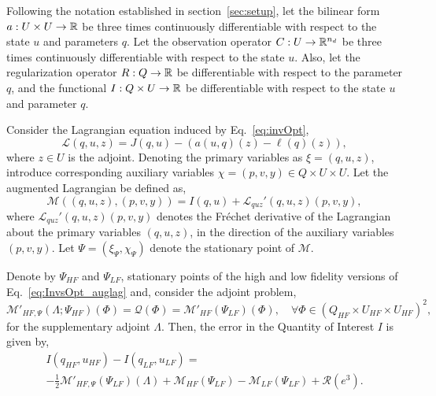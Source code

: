 \begin{theorem}
\label{thm:error_estimate}
Following the notation established in section~\ref{sec:setup}, let the bilinear form $a:U \times U \to {\mathbb{R}}$ be three times continuously differentiable with respect to the state $u$ and parameters $q$. Let the observation operator $C:U\to{\mathbb{R}}^{n_d}$ be three times continuously differentiable with respect to the state $u$. Also, let the regularization operator $R:Q\to{\mathbb{R}}$ be differentiable with respect to the parameter $q$, and the functional $I:Q\times U\to{\mathbb{R}}$ be differentiable with respect to the state $u$ and parameter $q$.

Consider the Lagrangian equation induced by Eq.~\eqref{eq:invOpt},
%
\begin{equation}
\label{eq:InvsOpt_lag}
\mathcal{L}(q,u,z)= J(q,u)-(a(u,q)(z)-\ell(q)(z)),
\end{equation}
%
where $z\in U$ is the adjoint. Denoting the primary variables as $\xi=(q,u,z)$, introduce corresponding auxiliary variables $\chi=(p,v,y)\in Q\times U\times U$. Let the augmented Lagrangian be defined as,
%
\begin{equation}
\label{eq:InvsOpt_auglag}
\mathcal{M}((q,u,z),(p,v,y)) = I(q,u) + \mathcal{L}_{quz}'(q,u,z)(p,v,y),
\end{equation}
%
where $\mathcal{L}_{quz}'(q,u,z)(p,v,y)$ denotes the Fr\'{e}chet derivative of the Lagrangian about the primary variables $(q,u,z)$, in the direction of the auxiliary variables $(p,v,y)$. Let $\Psi = (\xi_\Psi,\chi_\Psi)$ denote the stationary point of $\mathcal{M}$.

Denote by $\Psi_{HF}$ and $\Psi_{LF}$, stationary points of the high and low fidelity versions of Eq.~\eqref{eq:InvsOpt_auglag} and, consider the adjoint problem,
%
\begin{equation}
\label{eq:superAdjEq}
\mathcal{M}'_{HF,\Psi}(\Lambda;\Psi_{HF})(\Phi)=\mathcal{Q}(\Phi)=\mathcal M'_{HF}(\Psi_{LF})(\Phi),\quad\forall\Phi\in(Q_{HF}\times U_{HF}\times U_{HF})^2,
\end{equation}
%
for the supplementary adjoint $\Lambda$. Then, the error in the Quantity of Interest $I$ is given by,
%
\begin{multline}
\label{eq:finErrExp}
I(q_{HF},u_{HF})-I(q_{LF},u_{LF})=\\-\frac{1}{2}\mathcal{M}'_{HF,\Psi}(\Psi_{LF})(\Lambda)+\mathcal M_{HF}(\Psi_{LF})-\mathcal M_{LF}(\Psi_{LF})+\mathcal{R}(e^3).
\end{multline}
%
\end{theorem}

